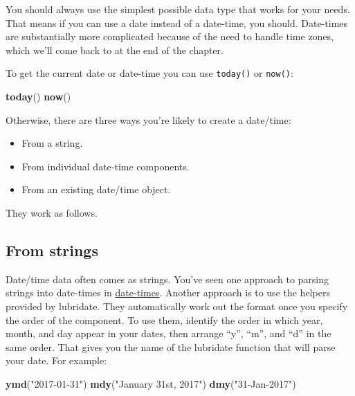 \documentclass[]{book}
\newenvironment{Shaded}{\begin{snugshade}}{\end{snugshade}}
\newcommand{\KeywordTok}[1]{\textcolor[rgb]{0.13,0.29,0.53}{\textbf{#1}}}
\newcommand{\StringTok}[1]{\textcolor[rgb]{0.31,0.60,0.02}{#1}}
\newcommand{\NormalTok}[1]{#1}
\providecommand{\tightlist}{%
  \setlength{\itemsep}{0pt}\setlength{\parskip}{0pt}}
\begin{document}
You should always use the simplest possible data type that works for
your needs. That means if you can use a date instead of a date-time, you
should. Date-times are substantially more complicated because of the
need to handle time zones, which we'll come back to at the end of the
chapter.

To get the current date or date-time you can use \texttt{today()} or
\texttt{now()}:

\begin{Shaded}
\begin{Highlighting}[]
\KeywordTok{today}\NormalTok{()}
\KeywordTok{now}\NormalTok{()}
\end{Highlighting}
\end{Shaded}

Otherwise, there are three ways you're likely to create a date/time:

\begin{itemize}
\tightlist
\item
  From a string.
\item
  From individual date-time components.
\item
  From an existing date/time object.
\end{itemize}

They work as follows.

\subsection{From strings}\label{from-strings}

Date/time data often comes as strings. You've seen one approach to
parsing strings into date-times in
\protect\hyperlink{readr-datetimes}{date-times}. Another approach is to
use the helpers provided by lubridate. They automatically work out the
format once you specify the order of the component. To use them,
identify the order in which year, month, and day appear in your dates,
then arrange ``y'', ``m'', and ``d'' in the same order. That gives you
the name of the lubridate function that will parse your date. For
example:

\begin{Shaded}
\begin{Highlighting}[]
\KeywordTok{ymd}\NormalTok{(}\StringTok{"2017-01-31"}\NormalTok{)}
\KeywordTok{mdy}\NormalTok{(}\StringTok{"January 31st, 2017"}\NormalTok{)}
\KeywordTok{dmy}\NormalTok{(}\StringTok{"31-Jan-2017"}\NormalTok{)}
\end{Highlighting}
\end{Shaded}
\end{document}
